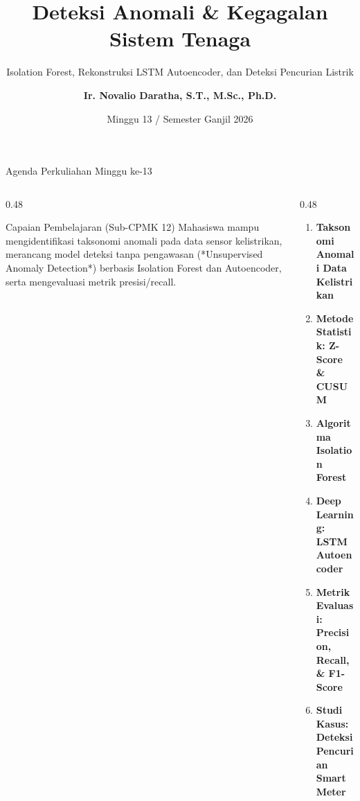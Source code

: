 \documentclass[aspectratio=169, 10pt]{beamer}
\title[\textbf{Deret Waktu (Minggu 13)}]{\textbf{Deteksi Anomali \& Kegagalan Sistem Tenaga}}
\subtitle{Isolation Forest, Rekonstruksi LSTM Autoencoder, dan Deteksi Pencurian Listrik}
\author[\textbf{Ir. Novalio Daratha, Ph.D.}]{\textbf{Ir. Novalio Daratha, S.T., M.Sc., Ph.D.}}
\institute[FT UNIB]{Program Studi Teknik Elektro -- Fakultas Teknik\\Universitas Bengkulu}
\date{Minggu 13 / Semester Ganjil 2026}
\begin{document}
\begin{frame}[plain]
    \titlepage
\end{frame}

\begin{frame}{Agenda Perkuliahan Minggu ke-13}
    \begin{columns}[T]
        \begin{column}{0.48\textwidth}
            \begin{block}{Capaian Pembelajaran (Sub-CPMK 12)}
                Mahasiswa mampu mengidentifikasi taksonomi anomali pada data sensor kelistrikan, merancang model deteksi tanpa pengawasan (*Unsupervised Anomaly Detection*) berbasis Isolation Forest dan Autoencoder, serta mengevaluasi metrik presisi/recall.
            \end{block}
        \end{column}
        \begin{column}{0.48\textwidth}
            \begin{enumerate}
                \item \textbf{Taksonomi Anomali Data Kelistrikan}
                \item \textbf{Metode Statistik: Z-Score \& CUSUM}
                \item \textbf{Algoritma Isolation Forest}
                \item \textbf{Deep Learning: LSTM Autoencoder}
                \item \textbf{Metrik Evaluasi: Precision, Recall, \& F1-Score}
                \item \textbf{Studi Kasus: Deteksi Pencurian Smart Meter}
            \end{enumerate}
        \end{column}
    \end{columns}
\end{frame}
\end{document}
